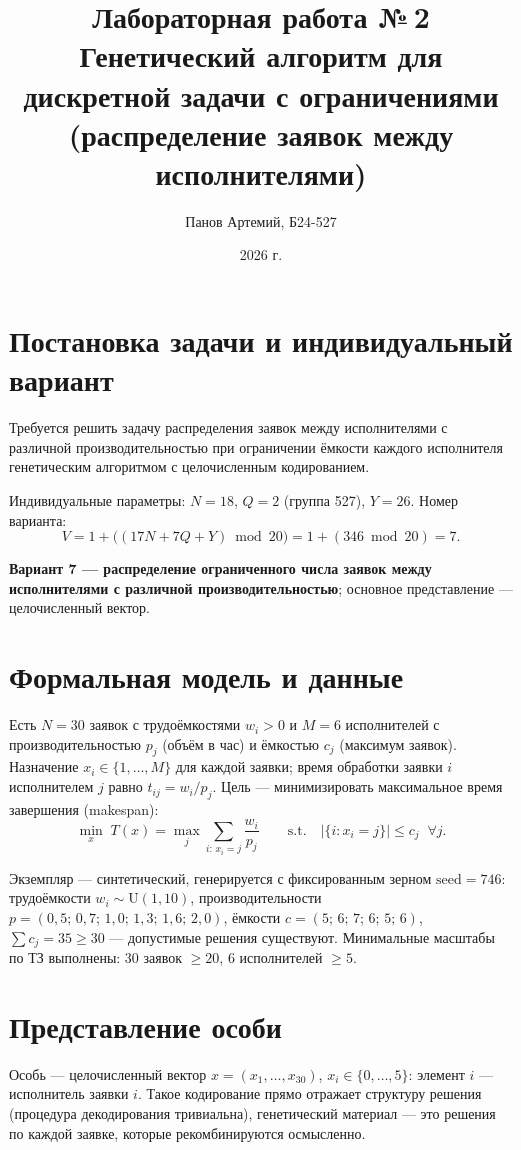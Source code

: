 \documentclass[12pt,a4paper]{article}
\title{Лабораторная работа №\,2\\ \large Генетический алгоритм для дискретной задачи с ограничениями (распределение заявок между исполнителями)}
\author{Панов Артемий, Б24-527}
\date{2026 г.}
\begin{document}
\maketitle

\section{Постановка задачи и индивидуальный вариант}

Требуется решить задачу распределения заявок между исполнителями с различной
производительностью при ограничении ёмкости каждого исполнителя
генетическим алгоритмом с целочисленным кодированием.

Индивидуальные параметры: $N = 18$, $Q = 2$ (группа 527), $Y = 26$. Номер
варианта:
\[
V = 1 + \big((17N + 7Q + Y) \bmod 20\big) = 1 + (346 \bmod 20) = 7.
\]

\textbf{Вариант 7 --- распределение ограниченного числа заявок между
исполнителями с различной производительностью}; основное представление ---
целочисленный вектор.

\section{Формальная модель и данные}

Есть $N = 30$ заявок с трудоёмкостями $w_i > 0$ и $M = 6$ исполнителей с
производительностью $p_j$ (объём в час) и ёмкостью $c_j$ (максимум заявок).
Назначение $x_i \in \{1, \dots, M\}$ для каждой заявки; время обработки
заявки $i$ исполнителем $j$ равно $t_{ij} = w_i / p_j$. Цель --- минимизировать
максимальное время завершения (makespan):
\[
\min_x \; T(x) = \max_{j} \sum_{i:\,x_i=j} \frac{w_i}{p_j}
\qquad
\text{s.t.}\quad \bigl|\{i : x_i = j\}\bigr| \le c_j \;\; \forall j.
\]

Экземпляр --- синтетический, генерируется с фиксированным зерном
$\text{seed} = 746$: трудоёмкости $w_i \sim \mathrm{U}(1, 10)$,
производительности $p = (0{,}5;\,0{,}7;\,1{,}0;\,1{,}3;\,1{,}6;\,2{,}0)$,
ёмкости $c = (5;\,6;\,7;\,6;\,5;\,6)$, $\sum c_j = 35 \ge 30$ --- допустимые
решения существуют. Минимальные масштабы по ТЗ выполнены: 30 заявок
$\ge 20$, 6 исполнителей $\ge 5$.

\section{Представление особи}

Особь --- целочисленный вектор $x = (x_1, \dots, x_{30})$,
$x_i \in \{0, \dots, 5\}$: элемент $i$ --- исполнитель заявки $i$. Такое
кодирование прямо отражает структуру решения (процедура декодирования
тривиальна), генетический материал --- это решения по каждой заявке, которые
рекомбинируются осмысленно.
\end{document}
